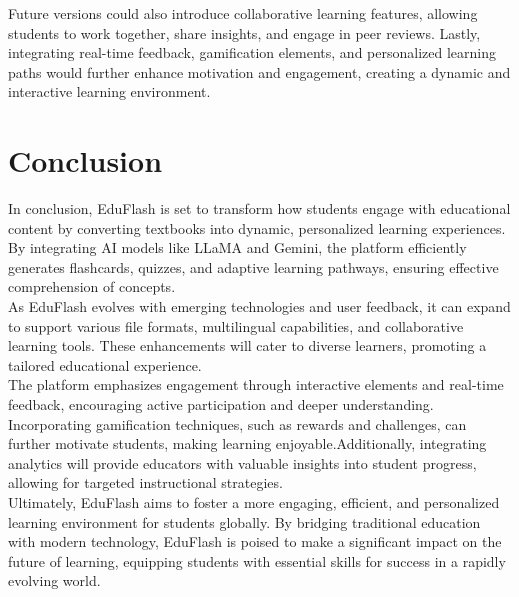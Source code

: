 \documentclass{report}
\begin{document}
Future versions could also introduce collaborative learning features, allowing students to work together, share insights, and engage in peer reviews. Lastly, integrating real-time feedback, gamification elements, and personalized learning paths would further enhance motivation and engagement, creating a dynamic and interactive learning environment.

\chapter{Conclusion}

In conclusion, EduFlash is set to transform how students engage with educational content by converting textbooks into dynamic, personalized learning experiences. By integrating AI models like LLaMA and Gemini, the platform efficiently generates flashcards, quizzes, and adaptive learning pathways, ensuring effective comprehension of concepts.\\

As EduFlash evolves with emerging technologies and user feedback, it can expand to support various file formats, multilingual capabilities, and collaborative learning tools. These enhancements will cater to diverse learners, promoting a tailored educational experience.\\

The platform emphasizes engagement through interactive elements and real-time feedback, encouraging active participation and deeper understanding. Incorporating gamification techniques, such as rewards and challenges, can further motivate students, making learning enjoyable.Additionally, integrating analytics will provide educators with valuable insights into student progress, allowing for targeted instructional strategies.\\

Ultimately, EduFlash aims to foster a more engaging, efficient, and personalized learning environment for students globally. By bridging traditional education with modern technology, EduFlash is poised to make a significant impact on the future of learning, equipping students with essential skills for success in a rapidly evolving world.
\end{document}
